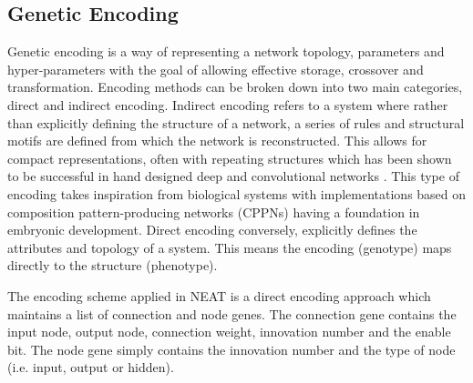 		



	\subsection{Genetic Encoding}\label{encoding}



		Genetic encoding is a way of representing a network topology, parameters and hyper-parameters with the goal of allowing effective storage, crossover and transformation. Encoding methods can be broken down into two main categories, direct and indirect encoding.
		Indirect encoding refers to a system where rather than explicitly defining the structure of a network, a series of rules and structural motifs are defined from which the network is reconstructed. This allows for compact representations, often with repeating structures which has been shown to be successful in hand designed deep and convolutional networks \cite{DNN} \cite{CNN}. This type of encoding takes inspiration from biological systems with implementations based on composition pattern-producing networks (CPPNs) \cite{CPPN} having a foundation in embryonic development.\cite{NE}
		Direct encoding conversely, explicitly defines the attributes and topology of a system. This means the encoding (genotype) maps directly to the structure (phenotype). 

		The encoding scheme applied in NEAT is a direct encoding approach which maintains a list of connection and node genes. The connection gene contains the input node, output node, connection weight, innovation number and the enable bit. The node gene simply contains the innovation number and the type of node (i.e. input, output or hidden).



